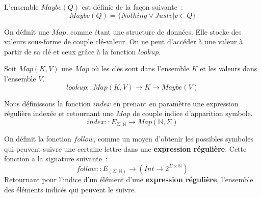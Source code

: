 \begin{Definition}
  L'ensemble \(Maybe(Q)\) est définie de la façon suivante~:
  \[
    Maybe(Q) = \{Nothing \lor Just v | v \in Q\}
  \]
\end{Definition}

\begin{Definition}
  On définit une \(Map\), comme étant une structure de données. Elle stocke 
  des valeurs sous-forme de couple clé-valeur. On ne peut d'accéder à une valeur
  à partir de sa clé et ceux grâce à la fonction \(lookup\).

  Soit \(Map(K, V)\) une \(Map\) où les clés sont dans l'ensemble \(K\) et les 
  valeurs dans l'ensemble \(V\).
  \[
    lookup :: Map(K, V) \to K \to Maybe(V)
  \]
\end{Definition}

\begin{Definition}
  Nous définissons la fonction \(index\) en prenant en paramètre une 
  expression régulière indexée et retournant une \(Map\) de couple indice 
  d'apparition symbole. 
  \[
    index :: E_{\Sigma, \mathbb{N}} \to Map(\mathbb{N}, \Sigma) 
  \]
\end{Definition}

\begin{Definition}
  On définit la fonction \(follow\), comme un moyen d'obtenir les possibles 
  symboles qui peuvent suivre une certaine lettre dans une 
  \textbf{expression régulière}. Cette fonction a la signature suivante~:
  \[
    follow :: E_{(\Sigma, \mathbb{N})} \to (Int \to 2^{\Sigma \times \mathbb{N}})
  \]
  Retournant pour l'indice d'un élément d'une \textbf{expression régulière}, 
  l'ensemble des éléments indicés qui peuvent le suivre.
\end{Definition}